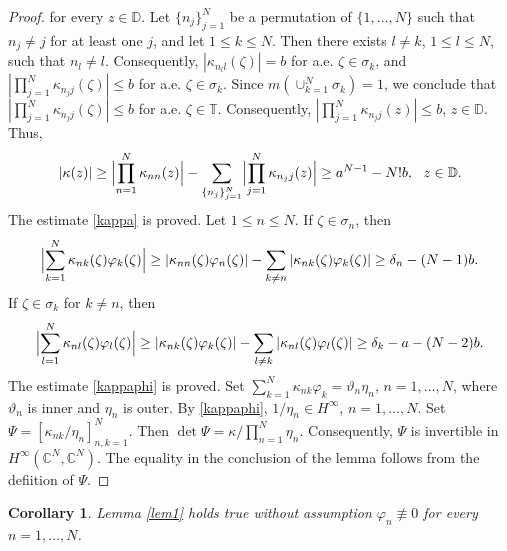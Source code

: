 \documentclass[a4paper,oneside,11pt]{amsart}
\numberwithin{equation}{section}
\theoremstyle{plain}
\newtheorem{corollary}[theorem]{Corollary}
\theoremstyle{definition}
\begin{document}
\begin{proof}
for every $z\in\mathbb D$. Let $\{n_j\}_{j=1}^N$ be a permutation of $\{1,\ldots, N\}$  such that $n_j\neq j$ for at least one $j$, and let $1\leq k\leq N$. 
Then there exists $l\neq k$, $1\leq l\leq N$,  such that $n_l\neq l$. Consequently, 
$|\kappa_{n_l l}(\zeta)|=b$ for a.e. $\zeta\in\sigma_k$, and $|\prod_{j=1}^N\kappa_{n_j j}(\zeta)|\leq b$ 
for  a.e. $\zeta\in\sigma_k$. Since  $m(\cup_{k=1}^N\sigma_k)=1$, we conclude that 
$|\prod_{j=1}^N\kappa_{n_j j}(\zeta)|\leq b$ 
for  a.e. $\zeta\in\mathbb T$. Consequently, $|\prod_{j=1}^N\kappa_{n_j j}(z)|\leq b$, $z\in\mathbb D$.
 Thus, 
\begin{equation*}
|\kappa(z)|\geq\Bigl|\prod_{n=1}^N\kappa_{nn}(z)\Bigr|-\sum_{\{n_j\}_{j=1}^N}
\Bigl|\prod_{j=1}^N\kappa_{n_j j}(z)\Bigr|\geq
 a^{N-1}-N!b, \ \ z\in\mathbb D.
\end{equation*}
The estimate \eqref{kappa} is proved.
Let $1\leq n\leq N$. If $\zeta\in\sigma_n$, then 
 \begin{equation*}\Bigl|\sum_{k=1}^N\kappa_{nk}(\zeta)\varphi_k(\zeta)\Bigr|\geq
|\kappa_{nn}(\zeta)\varphi_n(\zeta)|-\sum_{k\neq n}|\kappa_{nk}(\zeta)\varphi_k(\zeta)|\geq\delta_n-(N-1)b.
\end{equation*} 
If $\zeta\in\sigma_k$ for $k\neq n$,  then 
 \begin{equation*} \Bigl|\sum_{l=1}^N\kappa_{nl}(\zeta)\varphi_l(\zeta)\Bigr|\geq
|\kappa_{nk}(\zeta)\varphi_k(\zeta)|-\sum_{l\neq k}|\kappa_{nl}(\zeta)\varphi_l(\zeta)|\geq\delta_k-a-(N-2)b.
\end{equation*} 
The estimate \eqref{kappaphi} is proved. Set $\sum_{k=1}^N\kappa_{nk}\varphi_k=\vartheta_n\eta_n$, $n=1,\ldots, N$, 
where $\vartheta_n$ is inner and $\eta_n$ is outer. By \eqref{kappaphi}, $1/\eta_n\in H^\infty$, $n=1,\ldots, N$. 
Set $\Psi=[\kappa_{nk}/\eta_n]_{n,k=1}^N$. Then   $\det\Psi=\kappa/\prod_{n=1}^N\eta_n$. Consequently, $\Psi$ 
is invertible 
in $H^\infty(\mathbb C^N, \mathbb C^N)$. The equality in the conclusion of the lemma follows from the defiition of $\Psi$.
\end{proof}

\begin{corollary} \label{cor1} Lemma \ref{lem1} holds true without assumption $\varphi_n\not\equiv 0$ for every $n=1,\ldots, N$. 
\end{corollary}
\end{document}
